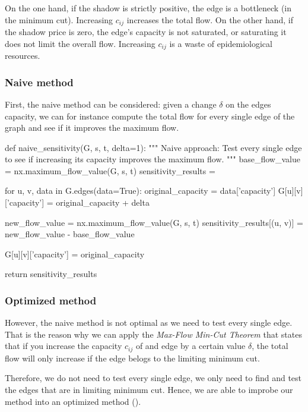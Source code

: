 \documentclass[12pt, openany]{article}
\begin{document}
On the one hand, if the shadow is strictly positive, the edge is a bottleneck (in the minimum cut). Increasing $c_{ij}$ increases the total flow. On the other hand, if the shadow price is zero, the edge's capacity is not saturated, or saturating it does not limit the overall flow. Increasing $c_{ij}$ is a waste of epidemiological resources.

\subsubsection{Naive method}\label{sec:1_naive_method}

First, the naive method can be considered: given a change $\delta$ on the edges capacity, we can for instance compute the total flow for every single edge of the graph and see if it improves the maximum flow.

\begin{python}[caption={Python code for the naive approach},  label={lst:1_naive_method_lst}]
def naive_sensitivity(G, s, t, delta=1):
    """
    Naive approach: Test every single edge to see if increasing its capacity improves the maximum flow.
    """
    base_flow_value = nx.maximum_flow_value(G, s, t)
    sensitivity_results = {}

    for u, v, data in G.edges(data=True):
        original_capacity = data['capacity']
        G[u][v]['capacity'] = original_capacity + delta
        
        new_flow_value = nx.maximum_flow_value(G, s, t)
        sensitivity_results[(u, v)] = new_flow_value - base_flow_value
        
        G[u][v]['capacity'] = original_capacity
        
    return sensitivity_results
\end{python}

\subsubsection{Optimized method}\label{sec:1_optimized_method}

However, the naive method is not optimal as we need to test every single edge. That is the reason why we can apply the \emph{Max-Flow Min-Cut Theorem} that states that if you increase the capacity $c_{ij}$ of and edge by a certain value $\delta$, the total flow will only increase if the edge belogs to the limiting minimum cut.

Therefore, we do not need to test every single edge, we only need to find and test the edges that are in limiting minimum cut. Hence, we are able to improbe our method into an optimized method ().
\end{document}
